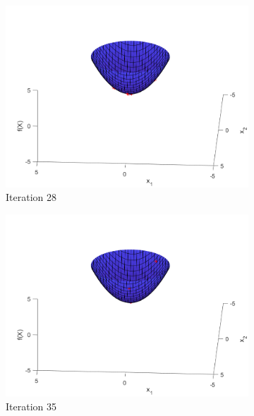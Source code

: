 \begin{figure}
\begin{subfigure}[b]{0.4\textwidth}
    \includegraphics[width=\textwidth]{img/smpl/sphr/loa-iter-28}
    \caption{Iteration 28}
    \label{fig:s2-iter-4}
  \end{subfigure}
  \begin{subfigure}[b]{0.4\textwidth}
    \includegraphics[width=\textwidth]{img/smpl/sphr/loa-iter-35}
    \caption{Iteration 35}
    \label{fig:s2-iter-5}
  \end{subfigure}
  \begin{subfigure}[b]{0.4\textwidth}

\end{subfigure}
\end{figure}
